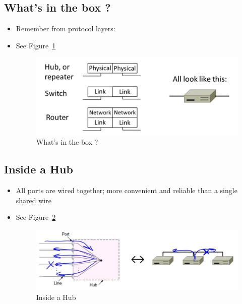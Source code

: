 \documentclass[12pt]{ctexart}   %
\begin{document}
	\subsection{What's in the box ? }
	\begin{itemize}
		\item Remember from protocol layers:
		\item See Figure~\ref{fig:3-7-3}
		
		\begin{figure}[h!] %
		\centering
		 \includegraphics[scale=0.7]{images/3-7-3}
		\caption{ What's in the box ?  }
		 \label{fig:3-7-3}
		 \end{figure}
	\end{itemize}
	
	\subsection{Inside a Hub}
	\begin{itemize}
		\item All ports are wired together; more convenient and reliable than a single shared wire
		\item See Figure~\ref{fig:3-7-4}
		
		\begin{figure}[h!] %
		\centering
		 \includegraphics[scale=0.7]{images/3-7-4}
		\caption{ Inside a Hub  }
		 \label{fig:3-7-4}
		 \end{figure}
	\end{itemize}
	
\end{document}
